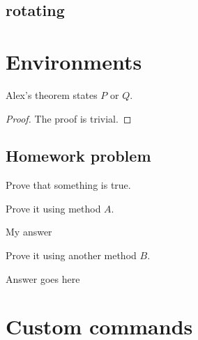 \documentclass[12pt]{article} %
\begin{document}
\subsection{rotating}


\vspace{1in}




\section{Environments}

\begin{theorem}
Alex's theorem states $P$ or $Q$. 
\end{theorem}

\begin{proof}
The proof is trivial. 
\end{proof}


\subsection{Homework problem}

\begin{em}
Prove that something is true. 
\end{em}


\begin{enumproblem}

\item \begin{em}
Prove it using method $A$. 
\end{em}

My answer


\item \begin{em}
Prove it using another method $B$. 
\end{em}

Answer goes here


\end{enumproblem}




\section{Custom commands}
\end{document}
